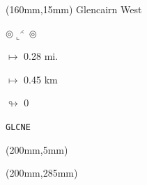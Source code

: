 \begin{textblock*}{40mm}(160mm,15mm)%
Glencairn West
\par $\circledcirc\llcorner^{\rightthreetimes}\circledcirc$
\Large
\par$\mapsto$ 0.28 mi.
\par$\mapsto$ 0.45 km
\par$\looparrowright$ 0
\par\hfill\tiny\tt GLCNE\\
\end{textblock*}
\begin{textblock*}{20mm}(200mm,5mm)%
\fbox{\thepage}
\end{textblock*}
\begin{textblock*}{20mm}(200mm,285mm)%
\fbox{\thepage}
\end{textblock*}
\null\newpage

